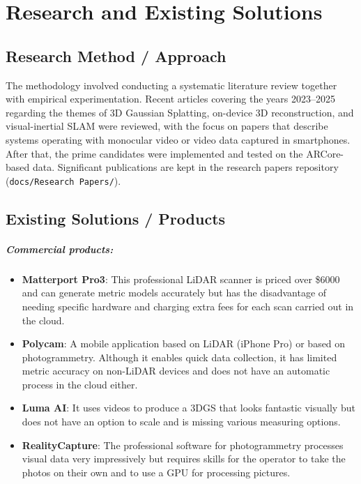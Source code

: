 \chapter{Research and Existing Solutions}

\section{Research Method / Approach}
The methodology involved conducting a systematic literature review together with empirical experimentation. Recent articles covering the years 2023--2025 regarding the themes of 3D Gaussian Splatting, on-device 3D reconstruction, and visual-inertial SLAM were reviewed, with the focus on papers that describe systems operating with monocular video or video data captured in smartphones. After that, the prime candidates were implemented and tested on the ARCore-based data. Significant publications are kept in the research papers repository (\texttt{docs/Research Papers/}).

\section{Existing Solutions / Products}

\paragraph{Commercial products:}
\begin{itemize}
    \item \textbf{Matterport Pro3}: This professional LiDAR scanner is priced over \$6000 and can generate metric models accurately but has the disadvantage of needing specific hardware and charging extra fees for each scan carried out in the cloud.
    \item \textbf{Polycam}: A mobile application based on LiDAR (iPhone Pro) or based on photogrammetry. Although it enables quick data collection, it has limited metric accuracy on non-LiDAR devices and does not have an automatic process in the cloud either.
    \item \textbf{Luma AI}: It uses videos to produce a 3DGS that looks fantastic visually but does not have an option to scale and is missing various measuring options.
    \item \textbf{RealityCapture}: The professional software for photogrammetry processes visual data very impressively but requires skills for the operator to take the photos on their own and to use a GPU for processing pictures.
\end{itemize}


